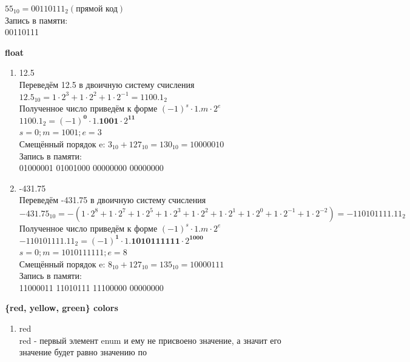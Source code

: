 \documentclass[a4paper,14pt]{extarticle}
\begin{document}
\begin{enumerate}
\begin{enumerate}[1. ]
		            $55_{10} = 00110111_2 (\textit{прямой код})$\\
		            Запись в памяти:\\
		            00110111
	      \end{enumerate}
	      \textbf{float}
	      \begin{enumerate}[1. ]
		      \item 12.5\\
		            Переведём 12.5 в двоичную систему счисления\\
		            $12.5_{10} = 1 \cdot 2 ^ 3 + 1 \cdot 2 ^ 2 + 1 \cdot 2 ^ {-1} = 1100.1_2$\\
		            Полученное число приведём к форме $(-1)^s \cdot 1.m \cdot 2^e$\\
		            $1100.1_2 = (-1) ^ \textbf{0} \cdot 1.\textbf{1001} \cdot 2 ^ {\textbf{11}}$\\
		            $s = 0; m = 1001; e = 3$\\
		            Смещённый порядок e: $3_{10} + 127_{10} = 130_{10} = 10000010$\\
		            Запись в памяти:\\
		            01000001 01001000 00000000 00000000
		      \item -431.75\\
		            Переведём -431.75 в двоичную систему счисления\\
		            $-431.75_{10} = -(1 \cdot 2 ^ 8 + 1 \cdot 2 ^ 7 + 1 \cdot 2 ^ 5 + 1 \cdot 2 ^ 3 + 1 \cdot 2 ^ 2 + 1 \cdot 2 ^ 1 + 1 \cdot 2 ^ 0 + 1 \cdot 2 ^ {-1} + 1 \cdot 2 ^ {-2}) = -110101111.11_2$\\
		            Полученное число приведём к форме $(-1)^s \cdot 1.m \cdot 2^e$\\
		            $-110101111.11_2 = (-1) ^ \textbf{1} \cdot 1.\textbf{1010111111} \cdot 2 ^ {\textbf{1000}}$\\
		            $s = 0; m = 1010111111; e = 8$\\
		            Смещённый порядок e: $8_{10} + 127_{10} = 135_{10} = 10000111$\\
		            Запись в памяти:\\
		            11000011 11010111 11100000 00000000
	      \end{enumerate}
	      \textbf{\{red, yellow, green\} colors}
	      \begin{enumerate}[1. ]
		      \item red\\
		            red - первый элемент enum и ему не присвоено значение, а значит его значение будет равно значению по

\end{enumerate}
\end{enumerate}
\end{document}
